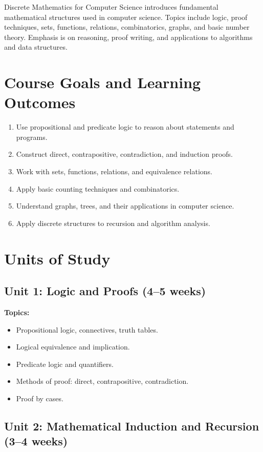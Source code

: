 \documentclass[12pt,oneside]{book}
\begin{document}
Discrete Mathematics for Computer Science introduces fundamental mathematical structures used in computer science. Topics include logic, proof techniques, sets, functions, relations, combinatorics, graphs, and basic number theory. Emphasis is on reasoning, proof writing, and applications to algorithms and data structures.

\section{Course Goals and Learning Outcomes}

\begin{enumerate}
    \item Use propositional and predicate logic to reason about statements and programs.
    \item Construct direct, contrapositive, contradiction, and induction proofs.
    \item Work with sets, functions, relations, and equivalence relations.
    \item Apply basic counting techniques and combinatorics.
    \item Understand graphs, trees, and their applications in computer science.
    \item Apply discrete structures to recursion and algorithm analysis.
\end{enumerate}

\section{Units of Study}

\subsection{Unit 1: Logic and Proofs (4--5 weeks)}

\textbf{Topics:}
\begin{itemize}
    \item Propositional logic, connectives, truth tables.
    \item Logical equivalence and implication.
    \item Predicate logic and quantifiers.
    \item Methods of proof: direct, contrapositive, contradiction.
    \item Proof by cases.
\end{itemize}

\subsection{Unit 2: Mathematical Induction and Recursion (3--4 weeks)}
\end{document}
